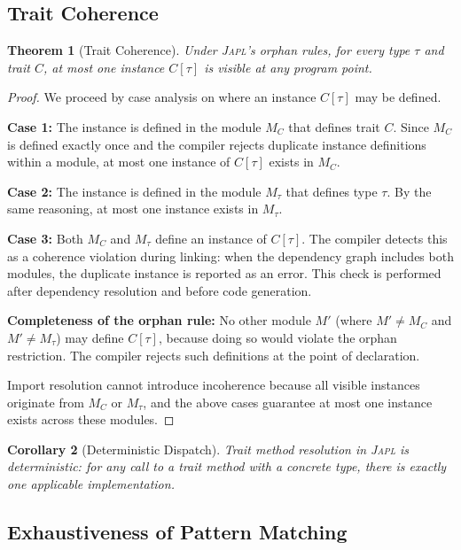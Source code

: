 \documentclass[11pt,a4paper]{article}
\newtheorem{theorem}{Theorem}[section]
\newtheorem{corollary}[theorem]{Corollary}
\newcommand{\japl}{\textsc{Japl}}
\begin{document}
\subsection{Trait Coherence}

\begin{theorem}[Trait Coherence]
\label{thm:coherence}
Under \japl{}'s orphan rules, for every type $\tau$ and trait $C$, at most one instance $C[\tau]$ is visible at any program point.
\end{theorem}

\begin{proof}
We proceed by case analysis on where an instance $C[\tau]$ may be defined.

\textbf{Case 1:} The instance is defined in the module $M_C$ that defines trait $C$. Since $M_C$ is defined exactly once and the compiler rejects duplicate instance definitions within a module, at most one instance of $C[\tau]$ exists in $M_C$.

\textbf{Case 2:} The instance is defined in the module $M_\tau$ that defines type $\tau$. By the same reasoning, at most one instance exists in $M_\tau$.

\textbf{Case 3:} Both $M_C$ and $M_\tau$ define an instance of $C[\tau]$. The compiler detects this as a coherence violation during linking: when the dependency graph includes both modules, the duplicate instance is reported as an error. This check is performed after dependency resolution and before code generation.

\textbf{Completeness of the orphan rule:} No other module $M'$ (where $M' \neq M_C$ and $M' \neq M_\tau$) may define $C[\tau]$, because doing so would violate the orphan restriction. The compiler rejects such definitions at the point of declaration.

Import resolution cannot introduce incoherence because all visible instances originate from $M_C$ or $M_\tau$, and the above cases guarantee at most one instance exists across these modules.
\end{proof}

\begin{corollary}[Deterministic Dispatch]
Trait method resolution in \japl{} is deterministic: for any call to a trait method with a concrete type, there is exactly one applicable implementation.
\end{corollary}

\subsection{Exhaustiveness of Pattern Matching}
\end{document}
